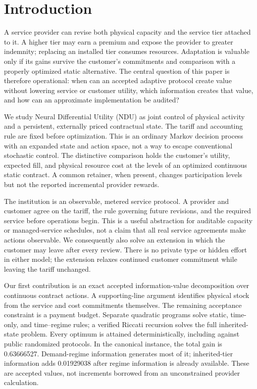 \documentclass[11pt,letterpaper]{article}
\theoremstyle{definition}
\newcommand{\1}{\mathbf 1}
\begin{document}
\section{Introduction}
A service provider can revise both physical capacity and the service tier attached to it. A higher tier may earn a premium and expose the provider to greater indemnity; replacing an installed tier consumes resources. Adaptation is valuable only if its gains survive the customer's commitments and comparison with a properly optimized static alternative. The central question of this paper is therefore operational: when can an accepted adaptive protocol create value without lowering service or customer utility, which information creates that value, and how can an approximate implementation be audited?

We study Neural Differential Utility (NDU) as joint control of physical activity and a persistent, externally priced contractual state. The tariff and accounting rule are fixed before optimization. This is an ordinary Markov decision process with an expanded state and action space, not a way to escape conventional stochastic control. The distinctive comparison holds the customer's utility, expected fill, and physical resource cost at the levels of an optimized continuous static contract. A common retainer, when present, changes participation levels but not the reported incremental provider rewards.

The institution is an observable, metered service protocol. A provider and customer agree on the tariff, the rule governing future revisions, and the required service before operations begin. This is a useful abstraction for auditable capacity or managed-service schedules, not a claim that all real service agreements make actions observable. We consequently also solve an extension in which the customer may leave after every review. There is no private type or hidden effort in either model; the extension relaxes continued customer commitment while leaving the tariff unchanged.

Our first contribution is an exact accepted information-value decomposition over continuous contract actions. A supporting-line argument identifies physical stock from the service and cost commitments themselves. The remaining acceptance constraint is a payment budget. Separate quadratic programs solve static, time-only, and time--regime rules; a verified Riccati recursion solves the full inherited-state problem. Every optimum is attained deterministically, including against public randomized protocols. In the canonical instance, the total gain is 0.63666527. Demand-regime information generates most of it; inherited-tier information adds 0.01929038 after regime information is already available. These are accepted values, not increments borrowed from an unconstrained provider calculation.
\end{document}
